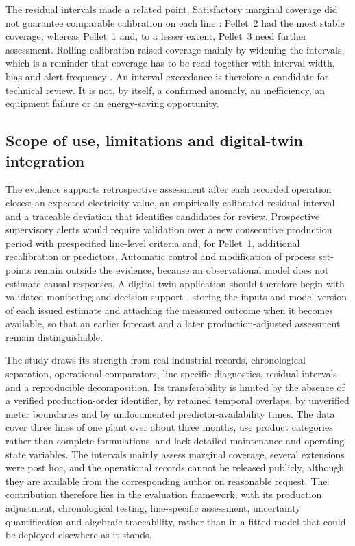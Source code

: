 The residual intervals made a related point. Satisfactory marginal coverage did not guarantee comparable calibration on each line \citep{barber2021,angelopoulos2021,barber2023}: Pellet~2 had the most stable coverage, whereas Pellet~1 and, to a lesser extent, Pellet~3 need further assessment. Rolling calibration raised coverage mainly by widening the intervals, which is a reminder that coverage has to be read together with interval width, bias and alert frequency \citep{gneitingcal2007,gneiting2007}. An interval exceedance is therefore a candidate for technical review. It is not, by itself, a confirmed anomaly, an inefficiency, an equipment failure or an energy-saving opportunity.

\subsection{Scope of use, limitations and digital-twin integration}
The evidence supports retrospective assessment after each recorded operation closes: an expected electricity value, an empirically calibrated residual interval and a traceable deviation that identifies candidates for review. Prospective supervisory alerts would require validation over a new consecutive production period with prespecified line-level criteria and, for Pellet~1, additional recalibration or predictors. Automatic control and modification of process set-points remain outside the evidence, because an observational model does not estimate causal responses. A digital-twin application should therefore begin with validated monitoring and decision support \citep{tao2019}, storing the inputs and model version of each issued estimate and attaching the measured outcome when it becomes available, so that an earlier forecast and a later production-adjusted assessment remain distinguishable.

The study draws its strength from real industrial records, chronological separation, operational comparators, line-specific diagnostics, residual intervals and a reproducible decomposition. Its transferability is limited by the absence of a verified production-order identifier, by retained temporal overlaps, by unverified meter boundaries and by undocumented predictor-availability times. The data cover three lines of one plant over about three months, use product categories rather than complete formulations, and lack detailed maintenance and operating-state variables. The intervals mainly assess marginal coverage, several extensions were post hoc, and the operational records cannot be released publicly, although they are available from the corresponding author on reasonable request. The contribution therefore lies in the evaluation framework, with its production adjustment, chronological testing, line-specific assessment, uncertainty quantification and algebraic traceability, rather than in a fitted model that could be deployed elsewhere as it stands.

